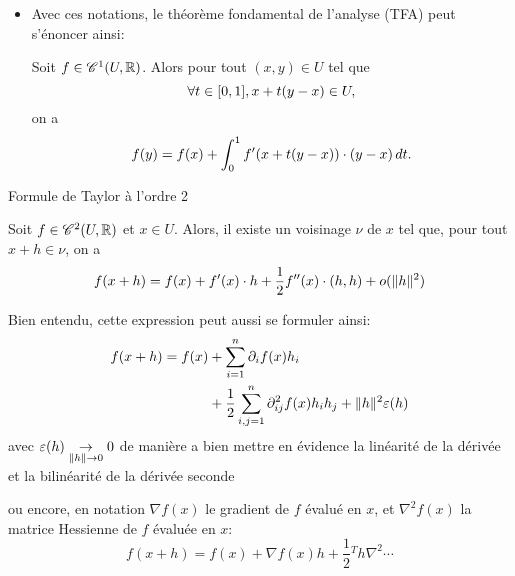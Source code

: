 \begin{notation}
\begin{itemize}
        \item Avec ces notations, le théorème fondamental de l'analyse (TFA) peut s'énoncer ainsi:
    
        \begin{theorem}
            Soit \(f\in \mathscr{C}^1(U, \mathbb{R})\). Alors pour tout \((x,y)\in U\) tel que
            \begin{equation*}
                \forall t\in \mathopen{}\left[0,1\right]\mathclose{}, x +t(y-x)\in U,
            \end{equation*}
            on a
            \begin{equation*}
                f(y) = f(x) + \int_0^1 f'(x+ t(y-x))\cdot(y-x)\mathop{}\!{d} t.
            \end{equation*}
        \end{theorem}
    \end{itemize}
\end{notation}




Formule de Taylor à l'ordre 2 %

Soit \(f\in \mathscr{C}^2(U, \mathbb{R})\) et \(x\in U\). Alors, il existe un voisinage
\(\nu\) de \(x\) tel que, pour tout \(x+h\in\nu\), on a
\begin{equation*}
    f(x+h) = f(x) + f'(x)\cdot h + \frac12 f''(x)\cdot(h,h) + o(\nn{h}^2) %
\end{equation*}

Bien entendu, cette expression peut aussi se formuler ainsi:
\begin{equation*}
    \begin{aligned}
        f(x+h) = f(x) &+ \sum_{i=1}^n \partial_i f(x) h_i\\
        &+ \frac12 \sum_{i,j=1}^n \partial^2_{ij} f(x) h_i h_j + \mathopen{}\left\|h\right\|\mathclose{}^2 \varepsilon(h)
    \end{aligned}
\end{equation*}
avec \(\varepsilon(h) \underset{\mathopen{}\left\|h\right\|\mathclose{}\to 0}{\to} 0\)
de manière a bien mettre en évidence la linéarité de la dérivée et
la bilinéarité de la dérivée seconde

ou encore, en notation \(\nabla f(x)\) le gradient de \(f\) évalué en \(x\),
et \(\nabla^2 f(x)\) la matrice Hessienne de \(f\) évaluée en \(x\):
\begin{equation*}
    f(x+h) = f(x) + \nabla f(x)h + \frac 12 {}^T h\nabla^2 \cdots
\end{equation*}

